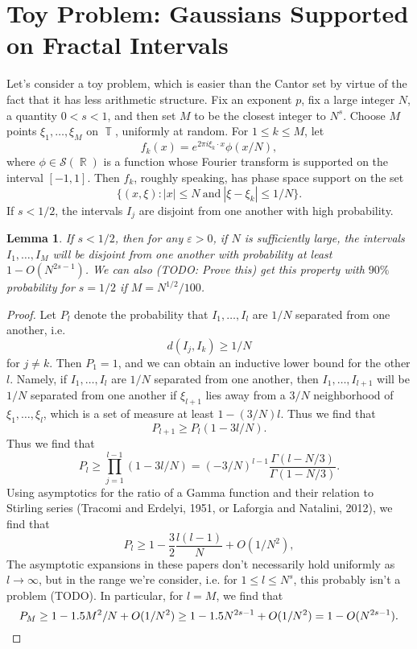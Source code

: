 \documentclass[dvipsnames,letterpaper,12pt]{article}
\numberwithin{equation}{section}
\DeclareMathOperator{\RR}{\mathbb{R}}
\DeclareMathOperator{\TT}{\mathbb{T}}
\newtheorem{lemma}[theorem]{Lemma}
\numberwithin{theorem}{section}
\begin{document}
\section{Toy Problem: Gaussians Supported on Fractal Intervals}

Let's consider a toy problem, which is easier than the Cantor set by virtue of the fact that it has less arithmetic structure. Fix an exponent $p$, fix a large integer $N$, a quantity $0 < s < 1$, and then set $M$ to be the closest integer to $N^s$. Choose $M$ points $\xi_1,\dots,\xi_M$ on $\TT$, uniformly at random. For $1 \leq k \leq M$, let
%
\[ f_k(x) = e^{2 \pi i \xi_k \cdot x} \phi(x/N), \]
%
where $\phi \in \mathcal{S}(\RR)$ is a function whose Fourier transform is supported on the interval $[-1,1]$. Then $f_k$, roughly speaking, has phase space support on the set
%
\[ \{ (x,\xi) : |x| \leq N\ \text{and}\ |\xi - \xi_k| \leq 1/N \}. \]
%
If $s < 1/2$, the intervals $I_j$ are disjoint from one another with high probability.

\begin{lemma}
    If $s < 1/2$, then for any $\varepsilon > 0$, if $N$ is sufficiently large, the intervals $I_1,\dots,I_M$ will be disjoint from one another with probability at least $1 - O(N^{2s - 1})$. We can also (TODO: Prove this) get this property with $90\%$ probability for $s = 1/2$ if $M = N^{1/2} / 100$.
\end{lemma}
\begin{proof}
    Let $P_l$ denote the probability that $I_1,\dots,I_l$ are $1/N$ separated from one another, i.e.
    \[ d(I_j, I_k) \geq 1/N \]
    for $j \neq k$. Then $P_1 = 1$, and we can obtain an inductive lower bound for the other $l$. Namely, if $I_1,\dots,I_l$ are $1/N$ separated from one another, then $I_1,\dots,I_{l+1}$ will be $1/N$ separated from one another if $\xi_{l+1}$ lies away from a $3/N$ neighborhood of $\xi_1,\dots,\xi_l$, which is a set of measure at least $1 - (3/N) l$. Thus we find that
    \[ P_{l+1} \geq P_l (1 - 3l/N). \]
    Thus we find that
    \[ P_l \geq \prod_{j = 1}^{l-1} (1 - 3l/N) = (-3/N)^{l-1} \frac{\Gamma(l - N/3)}{\Gamma(1 - N/3)}. \]
    Using asymptotics for the ratio of a Gamma function and their relation to Stirling series (Tracomi and Erdelyi, 1951, or Laforgia and Natalini, 2012), we find that
    \[ P_l \geq 1 - \frac{3}{2} \frac{l(l-1)}{N} + O(1/N^2), \]
    The asymptotic expansions in these papers don't necessarily hold uniformly as $l \to \infty$, but in the range we're consider, i.e. for $1 \leq l \leq N^s$, this probably isn't a problem (TODO). In particular, for $l = M$, we find that
    \[ P_M \geq 1 - 1.5 M^2 / N + O(1/N^2) \geq 1 - 1.5 N^{2s - 1} + O(1/N^2) = 1 - O(N^{2s-1}). \qedhere \]
\end{proof}
\end{document}
